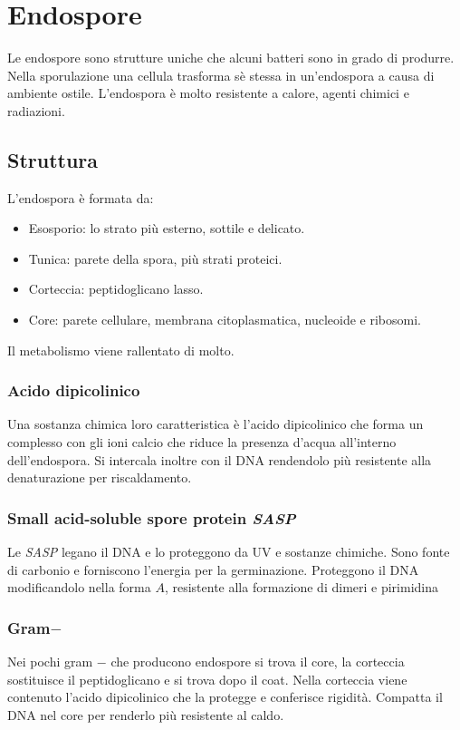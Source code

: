 \section{Endospore}
Le endospore sono strutture uniche che alcuni batteri sono in grado di produrre.
Nella sporulazione una cellula trasforma s\`e stessa in un'endospora a causa di ambiente ostile.
L'endospora \`e molto resistente a calore, agenti chimici e radiazioni.

	\subsection{Struttura}
	L'endospora \`e formata da:
	\begin{multicols}{2}
		\begin{itemize}
			\item Esosporio: lo strato pi\`u esterno, sottile e delicato.
			\item Tunica: parete della spora, pi\`u strati proteici.
			\item Corteccia: peptidoglicano lasso.
			\item Core: parete cellulare, membrana citoplasmatica, nucleoide e ribosomi.
		\end{itemize}
	\end{multicols}
	Il metabolismo viene rallentato di molto.
	
		\subsubsection{Acido dipicolinico}
		Una sostanza chimica loro caratteristica \`e l'acido dipicolinico che forma un complesso con gli ioni calcio  che riduce la presenza d'acqua all'interno dell'endospora.
		Si intercala inoltre con il DNA rendendolo pi\`u resistente alla denaturazione per riscaldamento.

		\subsubsection{Small acid-soluble spore protein \emph{SASP}}
		Le \emph{SASP} legano il DNA e lo proteggono da UV e sostanze chimiche.
		Sono fonte di carbonio e forniscono l'energia per la germinazione.
		Proteggono il DNA modificandolo nella forma $A$, resistente alla formazione di dimeri e pirimidina

		\subsubsection{Gram$\mathbf{-}$}
		Nei pochi gram $-$ che producono endospore si trova il core, la corteccia sostituisce il peptidoglicano e si trova dopo il coat.
		Nella corteccia viene contenuto l'acido dipicolinico che la protegge e conferisce rigidit\`a.
		Compatta il DNA nel core per renderlo pi\`u resistente al caldo.

